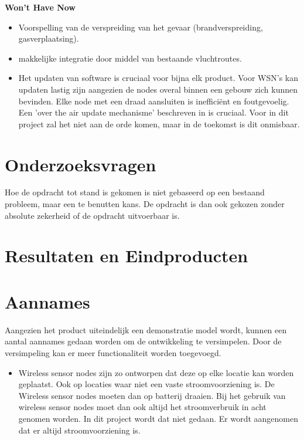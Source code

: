 \documentclass{../local}
\begin{document}
\noindent\textbf{Won't Have Now}
\begin{itemize}
\item Voorspelling van de verspreiding van het gevaar (brandverspreiding, gasverplaatsing).
\item makkelijke integratie door middel van bestaande vluchtroutes.
\item Het updaten van software is cruciaal voor bijna elk product. Voor WSN's kan updaten lastig zijn aangezien de nodes overal binnen een gebouw zich kunnen bevinden. Elke node met een draad aansluiten is inefficiënt en foutgevoelig. Een 'over the air update mechanisme' beschreven in \cite{StatRUP} is cruciaal. Voor in dit project zal het niet aan de orde komen, maar in de toekomst is dit onmisbaar.
\end{itemize}
\section{Onderzoeksvragen}
Hoe de opdracht tot stand is gekomen is niet gebaseerd op een bestaand probleem, maar een te benutten kans. De opdracht is dan ook gekozen zonder absolute zekerheid of de opdracht uitvoerbaar is. 

\section{Resultaten en Eindproducten}


\section{Aannames}
Aangezien het product uiteindelijk een demonstratie model wordt, kunnen een aantal aannames gedaan worden om de ontwikkeling te versimpelen. Door de versimpeling kan er meer functionaliteit worden toegevoegd.

\begin{itemize}
\item Wireless sensor nodes zijn zo ontworpen dat deze op elke locatie kan worden geplaatst. Ook op locaties waar niet een vaste stroomvoorziening is. De Wireless sensor nodes moeten dan op batterij draaien. Bij het gebruik van wireless sensor nodes moet dan ook altijd het stroomverbruik in acht genomen worden. In dit project wordt dat niet gedaan. Er wordt aangenomen dat er altijd stroomvoorziening is.
\end{itemize}
\end{document}
